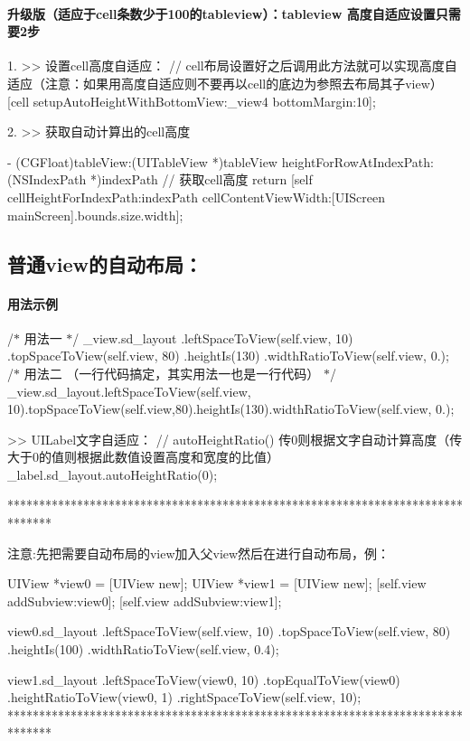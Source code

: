 \paragraph*{升级版（适应于cell条数少于100的tableview）：tableview 高度自适应设置只需要2步}

\begin{DoxyVerb}1. >> 设置cell高度自适应：
// cell布局设置好之后调用此方法就可以实现高度自适应（注意：如果用高度自适应则不要再以cell的底边为参照去布局其子view）
[cell setupAutoHeightWithBottomView:_view4 bottomMargin:10];

2. >> 获取自动计算出的cell高度 

- (CGFloat)tableView:(UITableView *)tableView heightForRowAtIndexPath:(NSIndexPath *)indexPath
{
// 获取cell高度
return [self cellHeightForIndexPath:indexPath cellContentViewWidth:[UIScreen mainScreen].bounds.size.width];
}
\end{DoxyVerb}


\subsection*{普通view的自动布局：}

\paragraph*{用法示例}

/$\ast$ 用法一 $\ast$/ \+\_\+view.\+sd\+\_\+layout .left\+Space\+To\+View(self.\+view, 10) .top\+Space\+To\+View(self.\+view, 80) .height\+Is(130) .width\+Ratio\+To\+View(self.\+view, 0.); ~\newline
 /$\ast$ 用法二 （一行代码搞定，其实用法一也是一行代码） $\ast$/ \+\_\+view.\+sd\+\_\+layout.\+left\+Space\+To\+View(self.\+view, 10).top\+Space\+To\+View(self.\+view,80).height\+Is(130).width\+Ratio\+To\+View(self.\+view, 0.);

\begin{DoxyVerb}>> UILabel文字自适应：
// autoHeightRatio() 传0则根据文字自动计算高度（传大于0的值则根据此数值设置高度和宽度的比值）
_label.sd_layout.autoHeightRatio(0);

*******************************************************************************

    注意:先把需要自动布局的view加入父view然后在进行自动布局，例： 

    UIView *view0 = [UIView new];
    UIView *view1 = [UIView new];
    [self.view addSubview:view0];
    [self.view addSubview:view1];

    view0.sd_layout
    .leftSpaceToView(self.view, 10)
    .topSpaceToView(self.view, 80)
    .heightIs(100)
    .widthRatioToView(self.view, 0.4);

    view1.sd_layout
    .leftSpaceToView(view0, 10)
    .topEqualToView(view0)
    .heightRatioToView(view0, 1)
    .rightSpaceToView(self.view, 10);
*******************************************************************************
\end{DoxyVerb}


